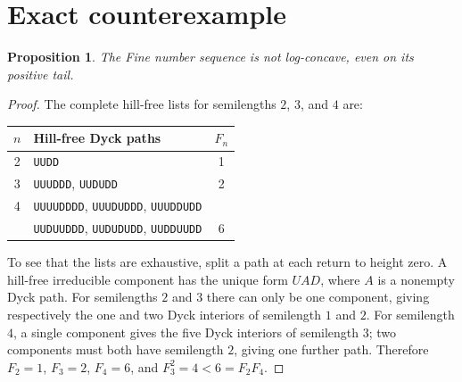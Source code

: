 \documentclass[11pt,a4paper]{article}
\newtheorem{proposition}{Proposition}
\begin{document}
\section{Exact counterexample}
\begin{proposition}
The Fine number sequence is not log-concave, even on its positive tail.
\end{proposition}
\begin{proof}
The complete hill-free lists for semilengths $2$, $3$, and $4$ are:
\begin{center}
\begin{tabular}{clc}
\toprule
$n$ & Hill-free Dyck paths & $F_n$ \\
\midrule
2 & \texttt{UUDD} & 1 \\
3 & \texttt{UUUDDD}, \texttt{UUDUDD} & 2 \\
4 & \texttt{UUUUDDDD}, \texttt{UUUDUDDD}, \texttt{UUUDDUDD} & \\
  & \texttt{UUDUUDDD}, \texttt{UUDUDUDD}, \texttt{UUDDUUDD} & 6 \\
\bottomrule
\end{tabular}
\end{center}
To see that the lists are exhaustive, split a path at each return
to height zero. A hill-free irreducible component has the unique form
$UAD$, where $A$ is a nonempty Dyck path. For semilengths $2$ and $3$
there can only be one component, giving respectively the one and two
Dyck interiors of semilength $1$ and $2$. For semilength $4$, a single
component gives the five Dyck interiors of semilength $3$; two
components must both have semilength $2$, giving one further path.
Therefore $F_2=1$, $F_3=2$, $F_4=6$, and
$F_3^2=4<6=F_2F_4$.
\end{proof}
\end{document}
